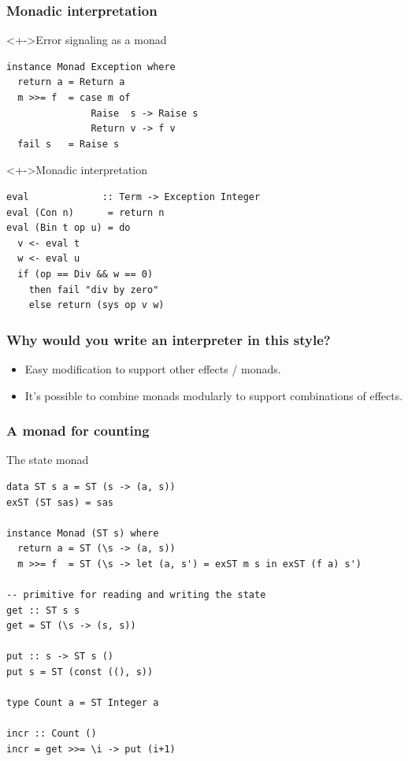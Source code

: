 \documentclass{beamer}
\begin{document}
\begin{frame}[fragile]
  \frametitle{Monadic interpretation}
\begin{block}<+->{Error signaling as a monad}
\begin{lstlisting}
instance Monad Exception where
  return a = Return a
  m >>= f  = case m of 
               Raise  s -> Raise s
               Return v -> f v
  fail s   = Raise s
\end{lstlisting}
\end{block}
\begin{block}<+->{Monadic interpretation}
\begin{lstlisting}
eval             :: Term -> Exception Integer
eval (Con n)      = return n
eval (Bin t op u) = do
  v <- eval t
  w <- eval u
  if (op == Div && w == 0) 
    then fail "div by zero"
    else return (sys op v w)
\end{lstlisting}
\end{block}
  
\end{frame}
\begin{frame}
  \frametitle{Why would you write an interpreter in this style?}
  \begin{itemize}
  \item Easy modification to support other effects / monads.
  \item It's possible to combine monads modularly to support
    combinations of effects.
  \end{itemize}
\end{frame}
\begin{frame}[fragile]
  \frametitle{A monad for counting}
  \begin{block}{The state monad}
\begin{lstlisting}
data ST s a = ST (s -> (a, s))
exST (ST sas) = sas

instance Monad (ST s) where
  return a = ST (\s -> (a, s))
  m >>= f  = ST (\s -> let (a, s') = exST m s in exST (f a) s')

-- primitive for reading and writing the state
get :: ST s s
get = ST (\s -> (s, s))

put :: s -> ST s ()
put s = ST (const ((), s))

type Count a = ST Integer a

incr :: Count ()
incr = get >>= \i -> put (i+1)
\end{lstlisting} 
\end{block}
\end{frame}
\end{document}
